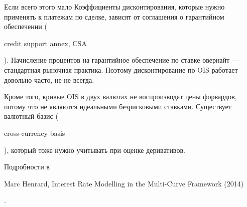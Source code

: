 \documentclass{beamer}
\newcommand{\en}[1]{\begin{otherlanguage}{english}#1\end{otherlanguage}}
\begin{document}
\begin{frame}{Если всего этого мало}
\justify
Коэффициенты дисконтирования, которые нужно применять к платежам по сделке, зависят от соглашения о гарантийном обеспечении (\en{credit support annex, CSA}). Начисление процентов на гарантийное обеспечение по ставке овернайт --- стандартная рыночная практика. Поэтому дисконтирование по OIS работает довольно часто, не не всегда.

\justify
Кроме того, кривые OIS в двух валютах не воспроизводят цены форвардов, потому что не являются идеальными безрисковыми ставками. Существует валютный базис (\en{cross-currency basis}), который тоже нужно учитывать при оценке деривативов.

\justify
Подробности в \en{Marc Henrard, Interest Rate Modelling in the Multi-Curve Framework (2014)}.
\end{frame}
\end{document}
